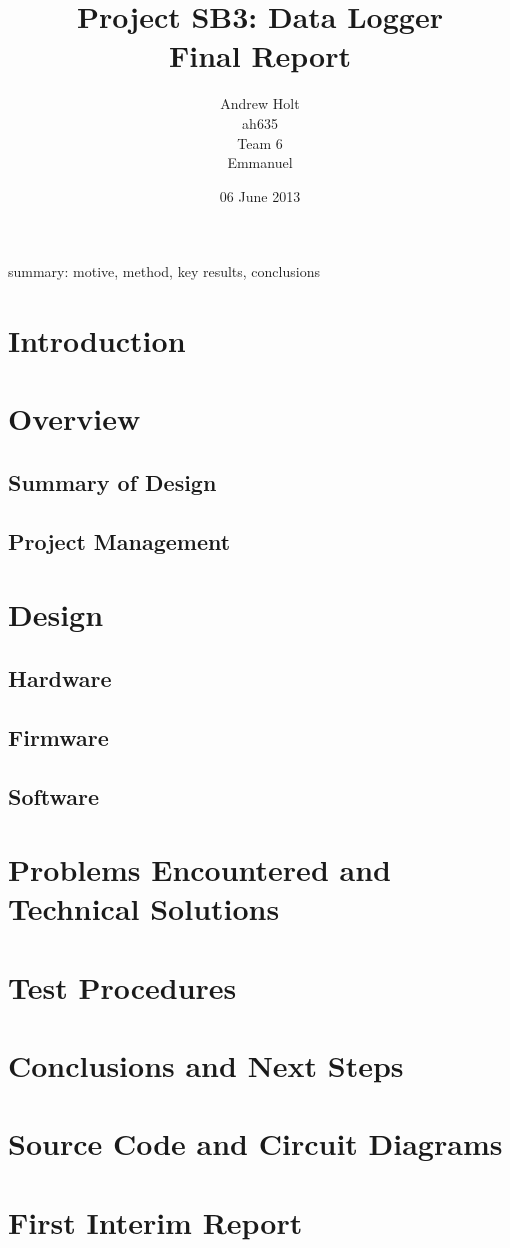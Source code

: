 \documentclass[a4paper,11pt]{article}  %
\title{Project SB3: Data Logger\\
       Final Report}
\author{Andrew Holt\\
        ah635\\
        Team 6\\
        Emmanuel}
\date{06 June 2013}
\begin{document}
\maketitle

summary: motive, method, key results, conclusions

\tableofcontents

\section{Introduction}

\section{Overview}

\subsection{Summary of Design}

\subsection{Project Management}

\section{Design}

\subsection{Hardware}

\subsection{Firmware}

\subsection{Software}

\section{Problems Encountered and Technical Solutions}

\section{Test Procedures}

\section{Conclusions and Next Steps}

\appendix

\section{Source Code and Circuit Diagrams}

\section{First Interim Report}
\end{document}
